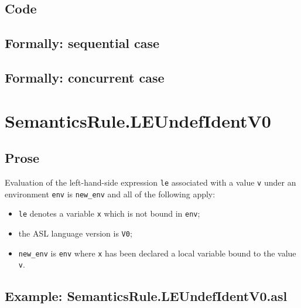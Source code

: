 \documentclass{book}
\begin{document}
  \subsection{Code}

\begin{emptyformal}
  \subsection{Formally: sequential case}

  \subsection{Formally: concurrent case}
\end{emptyformal}


\section{SemanticsRule.LEUndefIdentV0 \label{sec:SemanticsRule.LEUndefIdentV0}}

    \subsection{Prose}
    Evaluation of the left-hand-side expression \texttt{le} associated with a
value \texttt{v} under an environment \texttt{env} is \texttt{new\_env} and all
of the following apply:
    \begin{itemize}
    \item \texttt{le} denotes a variable \texttt{x} which is not bound in \texttt{env};
    \item the ASL language version is \texttt{V0};
    \item \texttt{new\_env} is \texttt{env} where \texttt{x} has been declared
a local variable bound to the value \texttt{v}.
    \end{itemize}

  \subsection{Example: SemanticsRule.LEUndefIdentV0.asl}
\end{document}
